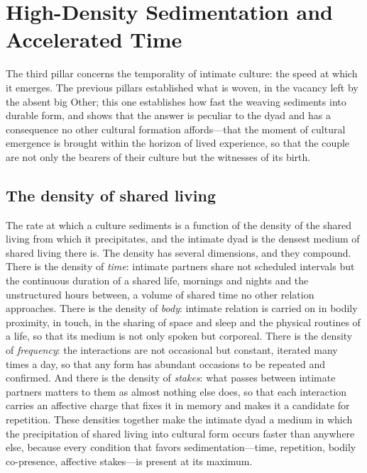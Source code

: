 \section{High-Density Sedimentation and Accelerated Time}
\label{p24:sec:sedimentation}

\noindent
The third pillar concerns the temporality of intimate culture: the speed at which it emerges. The previous pillars established what is woven, in the vacancy left by the absent big Other; this one establishes how fast the weaving sediments into durable form, and shows that the answer is peculiar to the dyad and has a consequence no other cultural formation affords---that the moment of cultural emergence is brought within the horizon of lived experience, so that the couple are not only the bearers of their culture but the witnesses of its birth.

\subsection*{The density of shared living}

The rate at which a culture sediments is a function of the density of the shared living from which it precipitates, and the intimate dyad is the densest medium of shared living there is. The density has several dimensions, and they compound. There is the density of \emph{time}: intimate partners share not scheduled intervals but the continuous duration of a shared life, mornings and nights and the unstructured hours between, a volume of shared time no other relation approaches. There is the density of \emph{body}: intimate relation is carried on in bodily proximity, in touch, in the sharing of space and sleep and the physical routines of a life, so that its medium is not only spoken but corporeal. There is the density of \emph{frequency}: the interactions are not occasional but constant, iterated many times a day, so that any form has abundant occasions to be repeated and confirmed. And there is the density of \emph{stakes}: what passes between intimate partners matters to them as almost nothing else does, so that each interaction carries an affective charge that fixes it in memory and makes it a candidate for repetition. These densities together make the intimate dyad a medium in which the precipitation of shared living into cultural form occurs faster than anywhere else, because every condition that favors sedimentation---time, repetition, bodily co-presence, affective stakes---is present at its maximum.

